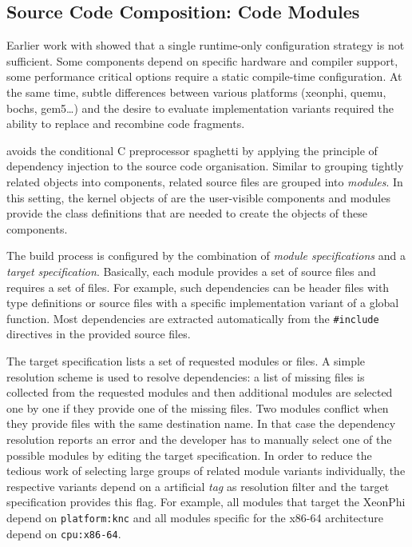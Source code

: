 \subsection{Source Code Composition: Code Modules}
\label{sec:code-modules-impl}

Earlier work with \mythos showed that a single runtime-only configuration strategy is not sufficient. Some components depend on specific hardware and compiler support, some performance critical options require a static compile-time configuration. At the same time, subtle differences between various platforms (xeonphi, quemu, bochs, gem5\ldots) and the desire to evaluate implementation variants required the ability to replace and recombine code fragments.

\mythos avoids the conditional C preprocessor spaghetti by applying the principle of dependency injection to the source code organisation. Similar to grouping tightly related objects into components, related source files are grouped into \emph{modules}. In this setting, the kernel objects of \mythos are the user-visible components and modules provide the class definitions that are needed to create the objects of these components. 

The build process is configured by the combination of \emph{module specifications} and a \emph{target specification}. Basically, each module provides a set of source files and requires a set of files. For example, such dependencies can be header files with type definitions or source files with a specific implementation variant of a global function. Most dependencies are extracted automatically from the \texttt{\#include} directives in the provided source files. 

The target specification lists a set of requested modules or files. A simple resolution scheme is used to resolve dependencies: a list of missing files is collected from the requested modules and then additional modules are selected one by one if they provide one of the missing files. Two modules conflict when they provide files with the same destination name. In that case the dependency resolution reports an error and the developer has to manually select one of the possible modules by editing the target specification. In order to reduce the tedious work of selecting large groups of related module variants individually, the respective variants depend on a artificial \emph{tag} as resolution filter and the target specification provides this flag. For example, all modules that target the XeonPhi depend on \texttt{platform:knc} and all modules specific for the x86-64 architecture depend on \texttt{cpu:x86-64}.


